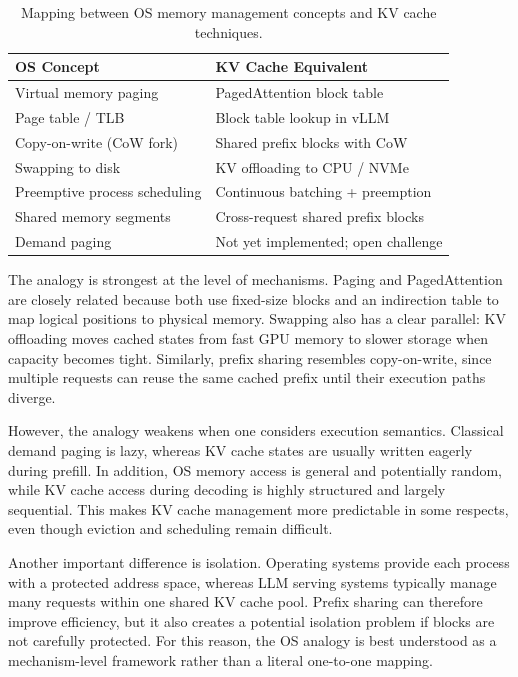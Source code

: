 \documentclass[10pt, a4paper]{article}
\begin{document}
\begin{table}[htbp]
    \centering
    \caption{Mapping between OS memory management concepts and KV cache techniques.}
    \label{tab:os_analogy}
    \begin{tabular}{p{5.5cm} p{7cm}}
        \toprule
        \textbf{OS Concept} & \textbf{KV Cache Equivalent} \\
        \midrule
        Virtual memory paging         & PagedAttention block table \\
        Page table / TLB              & Block table lookup in vLLM \\
        Copy-on-write (CoW fork)      & Shared prefix blocks with CoW \\
        Swapping to disk              & KV offloading to CPU / NVMe \\
        Preemptive process scheduling & Continuous batching + preemption \\
        Shared memory segments        & Cross-request shared prefix blocks \\
        Demand paging                 & Not yet implemented; open challenge \\
        \bottomrule
    \end{tabular}
\end{table}

The analogy is strongest at the level of mechanisms. Paging and
PagedAttention are closely related because both use fixed-size blocks
and an indirection table to map logical positions to physical memory.
Swapping also has a clear parallel: KV offloading moves cached states
from fast GPU memory to slower storage when capacity becomes tight.
Similarly, prefix sharing resembles copy-on-write, since multiple
requests can reuse the same cached prefix until their execution paths
diverge.

However, the analogy weakens when one considers execution semantics.
Classical demand paging is lazy, whereas KV cache states are usually
written eagerly during prefill. In addition, OS memory access is
general and potentially random, while KV cache access during decoding is
highly structured and largely sequential. This makes KV cache
management more predictable in some respects, even though eviction and
scheduling remain difficult.

Another important difference is isolation. Operating systems provide
each process with a protected address space, whereas LLM serving systems
typically manage many requests within one shared KV cache pool. Prefix
sharing can therefore improve efficiency, but it also creates a
potential isolation problem if blocks are not carefully protected. For
this reason, the OS analogy is best understood as a mechanism-level
framework rather than a literal one-to-one mapping.
\end{document}
